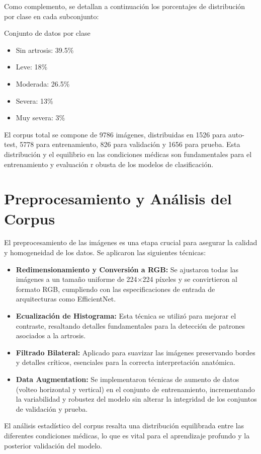 \documentclass[11pt,spanish,listoffigures,listoftables]{tfgetsinf}
\begin{document}
Como complemento, se detallan a continuación los porcentajes de distribución por clase en cada
 subconjunto:

Conjunto de datos por clase
\begin{itemize}
    \item Sin artrosis: 39.5\%
    \item Leve: 18\%
    \item Moderada: 26.5\%
    \item Severa: 13\%
    \item Muy severa: 3\%
\end{itemize}
El corpus total se compone de 9786 imágenes, distribuidas en 1526 para auto-test, 5778 para entrenamiento, 826 para validación y 
1656 para prueba. Esta distribución y el equilibrio en las condiciones médicas son fundamentales para el entrenamiento y evaluación r
obusta de los modelos de clasificación.

\section{Preprocesamiento y Análisis del Corpus}
El preprocesamiento de las imágenes es una etapa crucial para asegurar la calidad y homogeneidad de los datos. Se aplicaron las siguientes técnicas:

\begin{itemize}
    \item \textbf{Redimensionamiento y Conversión a RGB:} Se ajustaron todas las imágenes a un tamaño uniforme de 224$\times$224 píxeles y se convirtieron al formato RGB, cumpliendo con las especificaciones de entrada de arquitecturas como EfficientNet.
    \item \textbf{Ecualización de Histograma:} Esta técnica se utilizó para mejorar el contraste, resaltando detalles fundamentales para la detección de patrones asociados a la artrosis.
    \item \textbf{Filtrado Bilateral:} Aplicado para suavizar las imágenes preservando bordes y detalles críticos, esenciales para la correcta interpretación anatómica.
    \item \textbf{Data Augmentation:} Se implementaron técnicas de aumento de datos (volteo horizontal y vertical) en el conjunto de entrenamiento, incrementando la variabilidad y robustez del modelo sin alterar la integridad de los conjuntos de validación y prueba.
\end{itemize}

El análisis estadístico del corpus resalta una distribución equilibrada entre las diferentes condiciones médicas, lo que es vital para el aprendizaje profundo y la posterior validación del modelo.
\end{document}
